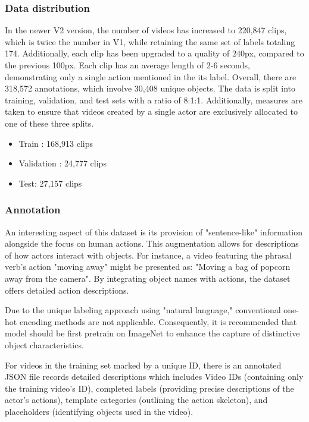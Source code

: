 \documentclass[10pt,onecolumn,letterpaper]{article}
\begin{document}
\subsubsection{Data distribution}
In the newer V2 version, the number of videos has increased to 220,847 clips, which is twice the number in V1, while retaining the same set of labels totaling 174. Additionally, each clip has been upgraded to a quality of 240px, compared to the previous 100px. Each clip has an average length of 2-6 seconds, demonstrating only a single action mentioned in the its label. Overall, there are 318,572 annotations, which involve 30,408 unique objects. The data is split into training, validation, and test sets with a ratio of 8:1:1. Additionally, measures are taken to ensure that videos created by a single actor are exclusively allocated to one of these three splits. 
\begin{itemize}
	\item Train : 168,913 clips
	\item Validation : 24,777 clips
	\item Test: 27,157 clips
\end{itemize}

\subsubsection{Annotation}

An interesting aspect of this dataset is its provision of "sentence-like" information alongside the focus on human actions. This augmentation allows for descriptions of how actors interact with objects. For instance, a video featuring the phrasal verb's action "moving away" might be presented as: "Moving a bag of popcorn away from the camera". By integrating object names with actions, the dataset offers detailed action descriptions. 

Due to the unique labeling approach using "natural language," conventional one-hot encoding methods are not applicable. Consequently, it is recommended that model should be first pretrain on ImageNet to enhance the capture of distinctive object characteristics.

For videos in the training set marked by a unique ID, there is an annotated JSON file records detailed descriptions which includes Video IDs (containing only the training video's ID), completed labels (providing precise descriptions of the actor's actions), template categories (outlining the action skeleton), and placeholders (identifying objects used in the video).
\end{document}
